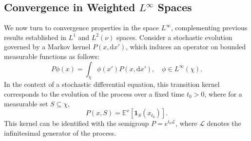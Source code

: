 \documentclass[11pt, twoside]{report}
\begin{document}

\subsection{Convergence in Weighted \texorpdfstring{$L^\infty$}{L-infinity} Spaces} \label{sec:linfty}

We now turn to convergence properties in the space $L^\infty$, complementing previous results established in $L^1$ and $L^2(\nu)$ spaces. Consider a stochastic evolution governed by a Markov kernel $P(x, \mathrm{d}x')$, which induces an operator on bounded measurable functions as follows:
\[
P\phi(x) = \int_\chi \phi(x')P(x, \mathrm{d}x'), \quad \phi \in L^\infty(\chi).
\]
In the context of a stochastic differential equation, this transition kernel corresponds to the evolution of the process over a fixed time $t_0 > 0$, where for a measurable set $S \subseteq \chi$,
\[
P(x, S) = \mathbb{E}^x\left[\mathbf{1}_S\left(x_{t_0}\right)\right].
\]
This kernel can be identified with the semigroup $P = e^{t_0 \mathcal{L}}$, where $\mathcal{L}$ denotes the infinitesimal generator of the process.
\end{document}
